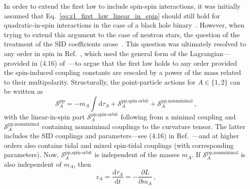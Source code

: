 \documentclass[prd,superscriptaddress,preprintnumbers,tightenlines,nofootinbib, eqsecnum]{revtex4-2}
\renewcommand{\dd}{\mathrm{d}}
\begin{document}
In order to extend the first law to include spin-spin interactions, it was initially assumed that Eq.~\eqref{eq:z1_first_law_linear_in_spin} should still hold for quadratic-in-spin interactions in the case of a black hole binary~\cite{Bini:2019lcd}. However, when trying to extend this argument to the case of neutron stars, the question of the treatment of the SID coefficients arose~\cite{Bini:2020zqy}. This question was ultimately resolved to any order in spin in Ref.~\cite{Antonelli:2020ybz}, which used the general form of the Lagrangian---provided in (4.16) of~\cite{Levi:2015msa}---to argue that the first law holds to any order provided the spin-induced coupling constants are rescaled by a power of the mass related to their multipolarity.
Structurally, the point-particle actions for $A\in\{1,2\}$ can be written as
\begin{equation}
\mathcal{S}^\text{pp}_A = - m_A \int \dd \tau_A + \mathcal{S}^\text{pp,spin-orbit}_A + \mathcal{S}^\text{pp,nonminimal}_A \,,
\end{equation}
with the linear-in-spin part $\mathcal{S}^\text{pp,spin-orbit}_A$ following from a minimal coupling and $\mathcal{S}^\text{pp,nonminimal}_A$ containing nonminimal couplings to the curvature tensor. The latter includes the SID couplings and parameters---see (4.16) in Ref.~\cite{Levi:2015msa}---and at higher orders also contains tidal and mixed spin-tidal couplings (with corresponding parameters). Now, $\mathcal{S}^\text{pp,spin-orbit}_A$ is independent of the masses $m_A$. If $\mathcal{S}^\text{pp,nonminimal}_A$ is also independent of $m_A$, then
\begin{equation}\label{eq:Lredshift}
 z_A = \frac{\dd \tau_A}{\dd t} = - \frac{\partial L}{\partial m_A} \,,
\end{equation}
\end{document}
